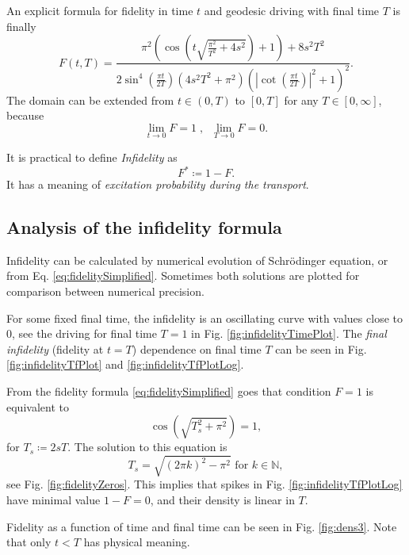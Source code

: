 An explicit formula for fidelity in time $t$ and geodesic driving with final time $T$ is finally
\begin{equation}
    F(t,T)=\frac{\pi ^2 \left(\cos \left(t \sqrt{\frac{\pi ^2}{T^2}+4 s^2}\right)+1\right)+8 s^2 T^2}{2 \sin ^4\left(\frac{\pi  t}{2 T}\right) \left(4 s^2 T^2+\pi ^2\right) \left(\left| \cot \left(\frac{\pi  t}{2 T}\right)\right|^2+1\right)^2}.
    \label{eq:fidelitySimplified}
\end{equation}
The domain can be extended from $t\in(0,T)$ to $[0,T]$ for any $T\in[0,\infty]$, because 
$$
    \lim_{t\rightarrow 0}F=1\; ,\;\; \lim_{T\rightarrow 0}F=0.
$$

It is practical to define \emph{Infidelity} as
\begin{equation}
    F^*\coloneqq 1-F.
\end{equation} 
It has a meaning of \emph{excitation probability during the transport}.


\subsection{Analysis of the infidelity formula}
Infidelity can be calculated by numerical evolution of Schr\"odinger equation, or from Eq. \ref{eq:fidelitySimplified}. Sometimes both solutions are plotted for comparison between numerical precision. 

For some fixed final time, the infidelity is an oscillating curve with values close to $0$, see the driving for final time $T=1$ in Fig. \ref{fig:infidelityTimePlot}. The \emph{final infidelity} (fidelity at $t=T$) dependence on final time $T$ can be seen in Fig. \ref{fig:infidelityTfPlot} and \ref{fig:infidelityTfPlotLog}.

From the fidelity formula \ref{eq:fidelitySimplified} goes that condition $F=1$ is equivalent to
\begin{equation}
    \cos \left(\sqrt{T_s^2+\pi ^2}\right)=1,
\end{equation}
for $T_s\coloneqq 2s T$. The solution to this equation is
\begin{equation}
    T_s=\sqrt{(2 \pi  k)^2-\pi ^2} \text{  for }k\in \mathbb{N},
    \label{eq:solutionT}
\end{equation}
see Fig. \ref{fig:fidelityZeros}. This implies that spikes in Fig. \ref{fig:infidelityTfPlotLog} have minimal value $1-F=0$, and their density is linear in $T$.

Fidelity as a function of time and final time can be seen in Fig. \ref{fig:dens3}. Note that only $t<T$ has physical meaning.

